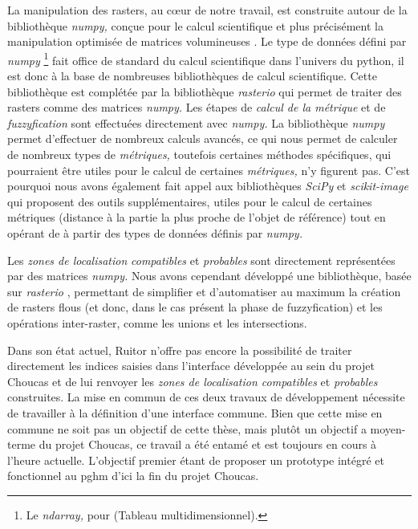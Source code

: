 La manipulation des rasters, au cœur de notre travail, est construite
autour de la bibliothèque \emph{numpy,} conçue pour le calcul
scientifique et plus précisément la manipulation optimisée de matrices
volumineuses \autocite{vanderWalt2011}. Le type de données défini par
\emph{numpy} \footnote{Le \emph{ndarray,} pour
   (Tableau
  multidimensionnel).} fait office de standard du calcul scientifique
dans l'univers du python, il est donc à la base de nombreuses
bibliothèques de calcul scientifique. Cette bibliothèque est complétée
par la bibliothèque \emph{rasterio} \autocite{Mapbox2020} qui permet
de traiter des rasters comme des matrices \emph{numpy.} Les étapes de
\emph{calcul de la métrique} et de \emph{fuzzyfication} sont
effectuées directement avec \emph{numpy.} La bibliothèque \emph{numpy}
permet d'effectuer de nombreux calculs avancés, ce qui nous permet de
calculer de nombreux types de \emph{métriques,} toutefois certaines
méthodes spécifiques, qui pourraient être utiles pour le calcul de
certaines \emph{métriques,} n'y figurent pas. C'est pourquoi nous
avons également fait appel aux bibliothèques \emph{SciPy} et
\emph{scikit-image} \autocite{vanderWalt2014,Virtanen2020} qui
proposent des outils supplémentaires, utiles pour le calcul de
certaines métriques (\eg distance à la partie la plus proche de
l'objet de référence) tout en opérant de à partir des types de données
définis par \emph{numpy.}

Les \emph{zones de localisation} \emph{compatibles} et
\emph{probables} sont directement représentées par des matrices
\emph{numpy.} Nous avons cependant développé une bibliothèque, basée
sur \emph{rasterio} \autocite{Mapbox2020}, permettant de simplifier et
d'automatiser au maximum la création de rasters flous (et donc, dans
le cas présent la phase de fuzzyfication) et les opérations
inter-raster, comme les unions et les intersections.

Dans son état actuel, Ruitor n'offre pas encore la possibilité de
traiter directement les indices saisies dans l'interface développée au
sein du projet Choucas \autocite{Viry2019a} et de lui renvoyer les
\emph{zones de localisation compatibles} et \emph{probables}
construites. La mise en commun de ces deux travaux de développement
nécessite de travailler à la définition d'une interface commune. Bien
que cette mise en commune ne soit pas un objectif de cette thèse, mais
plutôt un objectif a moyen-terme du projet Choucas, ce travail a été
entamé et est toujours en cours à l'heure actuelle. L'objectif premier
étant de proposer un prototype intégré et fonctionnel au \ac{pghm}
d'ici la fin du projet Choucas.

